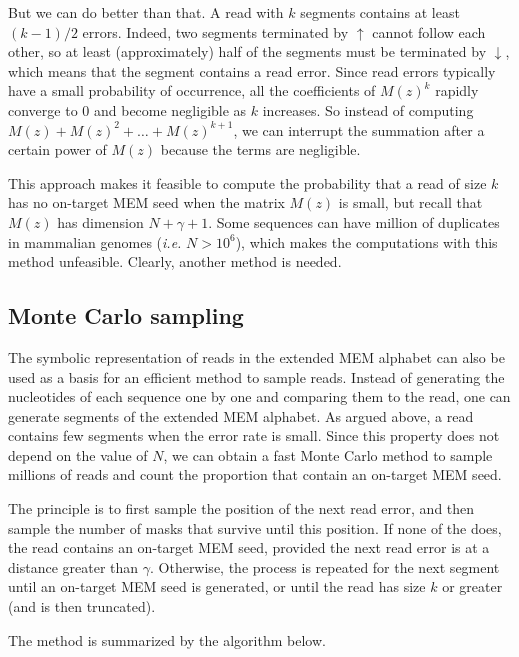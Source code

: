 \documentclass{article}
\begin{document}
But we can do better than that. A read with $k$ segments contains at least
$(k-1)/2$ errors. Indeed, two segments terminated by $\uparrow$ cannot
follow each other, so at least (approximately) half of the segments must
be terminated by $\downarrow$, which means that the segment contains a
read error. Since read errors typically have a small probability of
occurrence, all the coefficients of $M(z)^k$ rapidly converge to $0$ and
become negligible as $k$ increases. So instead of computing $M(z) + M(z)^2
+ \ldots + M(z)^{k+1}$, we can interrupt the summation after a certain
power of $M(z)$ because the terms are negligible.

This approach makes it feasible to compute the probability that a read of
size $k$ has no on-target MEM seed when the matrix $M(z)$ is small, but
recall that $M(z)$ has dimension $N+\gamma+1$. Some sequences can have
million of duplicates in mammalian genomes (\textit{i.e.} $N > 10^6$),
which makes the computations with this method unfeasible. Clearly, another
method is needed.


\subsection{Monte Carlo sampling}

The symbolic representation of reads in the extended MEM alphabet can also
be used as a basis for an efficient method to sample reads. Instead of
generating the nucleotides of each sequence one by one and comparing them
to the read, one can generate segments of the extended MEM alphabet. As
argued above, a read contains few segments when the error rate is small.
Since this property does not depend on the value of $N$, we can obtain a
fast Monte Carlo method to sample millions of reads and count the
proportion that contain an on-target MEM seed.

The principle is to first sample the position of the next read error, and
then sample the number of masks that survive until this position. If none
of the does, the read contains an on-target MEM seed, provided the next
read error is at a distance greater than $\gamma$. Otherwise, the process
is repeated for the next segment until an on-target MEM seed is generated,
or until the read has size $k$ or greater (and is then truncated).

The method is summarized by the algorithm below.
\end{document}

